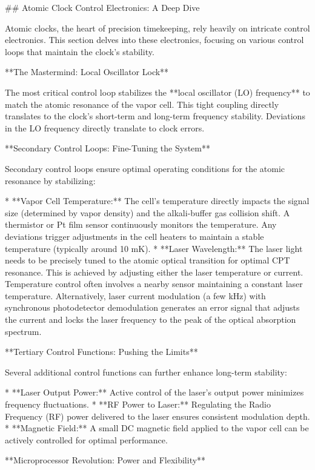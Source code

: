 ## Atomic Clock Control Electronics: A Deep Dive

Atomic clocks, the heart of precision timekeeping, rely heavily on intricate control electronics. This section delves into these electronics, focusing on various control loops that maintain the clock's stability.

**The Mastermind: Local Oscillator Lock**

The most critical control loop stabilizes the **local oscillator (LO) frequency** to match the atomic resonance of the vapor cell. This tight coupling directly translates to the clock's short-term and long-term frequency stability.  Deviations in the LO frequency directly translate to clock errors.

**Secondary Control Loops: Fine-Tuning the System**

Secondary control loops ensure optimal operating conditions for the atomic resonance by stabilizing:

* **Vapor Cell Temperature:** The cell's temperature directly impacts the signal size (determined by vapor density) and the alkali-buffer gas collision shift. A thermistor or Pt film sensor continuously monitors the temperature. Any deviations trigger adjustments in the cell heaters to maintain a stable temperature (typically around 10 mK).
* **Laser Wavelength:** The laser light needs to be precisely tuned to the atomic optical transition for optimal CPT resonance. This is achieved by adjusting either the laser temperature or current.  Temperature control often involves a nearby sensor maintaining a constant laser temperature.  Alternatively, laser current modulation (a few kHz) with synchronous photodetector demodulation generates an error signal that adjusts the current and locks the laser frequency to the peak of the optical absorption spectrum.

**Tertiary Control Functions: Pushing the Limits**

Several additional control functions can further enhance long-term stability:

* **Laser Output Power:** Active control of the laser's output power minimizes frequency fluctuations.
* **RF Power to Laser:** Regulating the Radio Frequency (RF) power delivered to the laser ensures consistent modulation depth.
* **Magnetic Field:** A small DC magnetic field applied to the vapor cell can be actively controlled for optimal performance.

**Microprocessor Revolution: Power and Flexibility**

